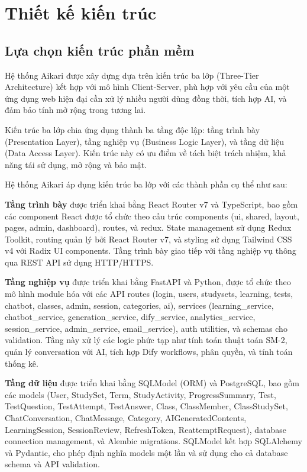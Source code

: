 \documentclass[../DoAn.tex]{subfiles}
\begin{document}
\section{Thiết kế kiến trúc}
\label{section:4.1}

\subsection{Lựa chọn kiến trúc phần mềm}
\label{subsection:4.1.1}

Hệ thống Aikari được xây dựng dựa trên kiến trúc ba lớp (Three-Tier Architecture) kết hợp với mô hình Client-Server, phù hợp với yêu cầu của một ứng dụng web hiện đại cần xử lý nhiều người dùng đồng thời, tích hợp AI, và đảm bảo tính mở rộng trong tương lai.

Kiến trúc ba lớp chia ứng dụng thành ba tầng độc lập: tầng trình bày (Presentation Layer), tầng nghiệp vụ (Business Logic Layer), và tầng dữ liệu (Data Access Layer). Kiến trúc này có ưu điểm về tách biệt trách nhiệm, khả năng tái sử dụng, mở rộng và bảo mật.

Hệ thống Aikari áp dụng kiến trúc ba lớp với các thành phần cụ thể như sau:

\textbf{Tầng trình bày} được triển khai bằng React Router v7 và TypeScript, bao gồm các component React được tổ chức theo cấu trúc components (ui, shared, layout, pages, admin, dashboard), routes, và redux. State management sử dụng Redux Toolkit, routing quản lý bởi React Router v7, và styling sử dụng Tailwind CSS v4 với Radix UI components. Tầng trình bày giao tiếp với tầng nghiệp vụ thông qua REST API sử dụng HTTP/HTTPS.

\textbf{Tầng nghiệp vụ} được triển khai bằng FastAPI và Python, được tổ chức theo mô hình module hóa với các API routes (login, users, studysets, learning, tests, chatbot, classes, admin, session, categories, ai), services (learning\_service, chatbot\_service, generation\_service, dify\_service, analytics\_service, session\_service, admin\_service, email\_service), auth utilities, và schemas cho validation. Tầng này xử lý các logic phức tạp như tính toán thuật toán SM-2, quản lý conversation với AI, tích hợp Dify workflows, phân quyền, và tính toán thống kê.

\textbf{Tầng dữ liệu} được triển khai bằng SQLModel (ORM) và PostgreSQL, bao gồm các models (User, StudySet, Term, StudyActivity, ProgressSummary, Test, TestQuestion, TestAttempt, TestAnswer, Class, ClassMember, ClassStudySet, ChatConversation, ChatMessage, Category, AIGeneratedContents, LearningSession, SessionReview, RefreshToken, ReattemptRequest), database connection management, và Alembic migrations. SQLModel kết hợp SQLAlchemy và Pydantic, cho phép định nghĩa models một lần và sử dụng cho cả database schema và API validation.
\end{document}
